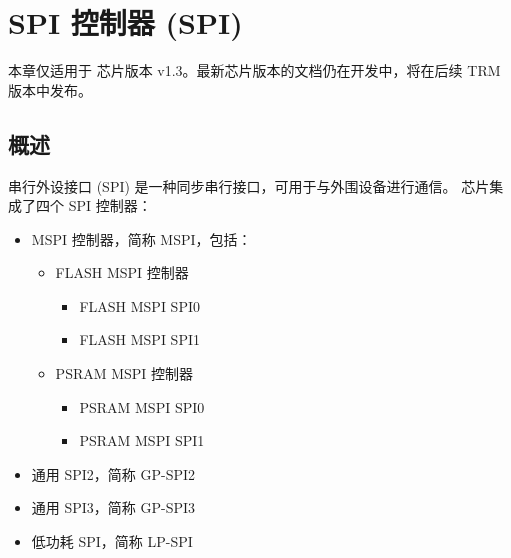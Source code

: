 \documentclass[main\_\_CN.tex]{subfiles}
\begin{document}

\ifglobal
\else
    {\let\clearpage\relax \listoftodos}
    {\let\clearpage\relax \listofdonetodos}
    \tableofcontents
\fi


\hypertarget{spi}{}
\chapter{SPI 控制器 (SPI)}
\label{mod:spi}

\begin{tiplisting}
本章仅适用于 \chipname{} 芯片版本 v1.3。最新芯片版本的文档仍在开发中，将在后续 TRM 版本中发布。
\end{tiplisting}

\section{概述}

串行外设接口 (SPI) 是一种同步串行接口，可用于与外围设备进行通信。 
 \chipname{} 芯片集成了四个 SPI 控制器： 
\begin{itemize}
  \item MSPI 控制器，简称 MSPI，包括：
  \begin{itemize}
      \item FLASH MSPI 控制器
      \begin{itemize}
          \item FLASH MSPI SPI0
          \item FLASH MSPI SPI1
      \end{itemize}
      \item PSRAM MSPI 控制器
      \begin{itemize}
          \item PSRAM MSPI SPI0
          \item PSRAM MSPI SPI1
      \end{itemize}
  \end{itemize}
  \item 通用 SPI2，简称 GP-SPI2
  \item 通用 SPI3，简称 GP-SPI3
  \item 低功耗 SPI，简称 LP-SPI
\end{itemize}
\end{document}
